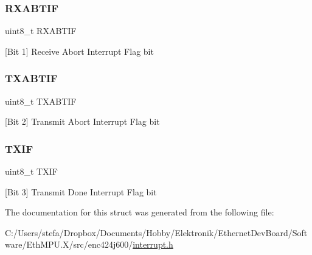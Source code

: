 \mbox{\label{structinterrupt_flags___adfd2bd74bfbf9d086ac5364f2c2bc420}} 
\subsubsection{\texorpdfstring{RXABTIF}{RXABTIF}}
{\footnotesize\ttfamily uint8\+\_\+t R\+X\+A\+B\+T\+IF}



\mbox{[}Bit 1\mbox{]} Receive Abort Interrupt Flag bit 

\mbox{\label{structinterrupt_flags___aef79dc4f43ab3844327f963cedfc3a57}} 
\subsubsection{\texorpdfstring{TXABTIF}{TXABTIF}}
{\footnotesize\ttfamily uint8\+\_\+t T\+X\+A\+B\+T\+IF}



\mbox{[}Bit 2\mbox{]} Transmit Abort Interrupt Flag bit 

\mbox{\label{structinterrupt_flags___a8ac6b64dff7b25ddf36cea5543329e56}} 
\subsubsection{\texorpdfstring{TXIF}{TXIF}}
{\footnotesize\ttfamily uint8\+\_\+t T\+X\+IF}



\mbox{[}Bit 3\mbox{]} Transmit Done Interrupt Flag bit 



The documentation for this struct was generated from the following file\+:\begin{DoxyCompactItemize}
\item 
C\+:/\+Users/stefa/\+Dropbox/\+Documents/\+Hobby/\+Elektronik/\+Ethernet\+Dev\+Board/\+Software/\+Eth\+M\+P\+U.\+X/src/enc424j600/\mbox{\hyperlink{interrupt_8h}{interrupt.\+h}}\end{DoxyCompactItemize}
